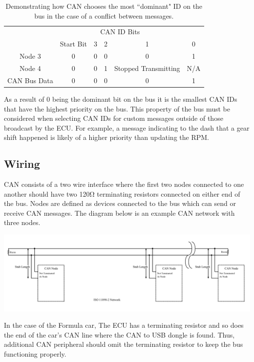 \documentclass[letterpaper]{article}
\begin{document}
\begin{center}
  \begin{table}
  \begin{tabular}{c|c|c|c|c|c|}
    \cline{2-6}
      & \multicolumn{4}{c}{CAN ID Bits} & \\
    \cline{2-6}
      & Start Bit & 3 & 2 & 1 & 0\\
    \cline{1-6}
      \multicolumn{1}{|c|}{Node 3} & 0 & 0 & 0 & 0 & 1 \\
    \cline{1-6}
      \multicolumn{1}{|c|}{Node 4} & 0 & 0 & 1 & Stopped Transmitting & N/A \\
    \cline{1-6}
      \multicolumn{1}{|c|}{CAN Bus Data} & 0 & 0 & 0 & 0 & 1 \\
    \hline
  \end{tabular}
  \caption{
  \label{tab:Address Conflict Resolution}
    Demonstrating how CAN chooses the most ``dominant" ID on the bus in the
    case of a conflict between messages.
  }
  \end{table}
\end{center}

As a result of 0 being the dominant bit on the bus it is the smallest
CAN IDs that have the highest priority on the bus. This property of the bus must
be considered when selecting CAN IDs for custom messages outside of those
broadcast by the ECU. For example, a message indicating to the dash that a gear
shift happened is likely of a higher priority than updating the RPM.

\subsection{Wiring}
CAN consists of a two wire interface where the first two nodes connected to one
another should have two 120\si{\ohm} terminating resistors connected on either
end of the bus. Nodes are defined as devices connected to the bus which can send
or receive CAN messages. The diagram below is an example CAN network with three nodes.

\begin{center}
  \includegraphics[width=\textwidth]{CAN-network-diagram}
\end{center}

In the case of the Formula car, The ECU has a terminating resistor and so does
the end of the car's CAN line where the CAN to USB dongle is found. Thus,
additional CAN peripheral should omit the terminating resistor to keep the bus
functioning properly.
\end{document}
